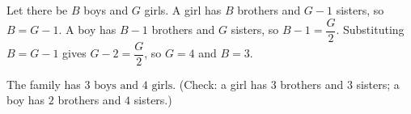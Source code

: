 Let there be $B$ boys and $G$ girls. A girl has $B$ brothers and $G-1$ sisters, so $B=G-1$. A boy has $B-1$ brothers and $G$ sisters, so $B-1=\dfrac G2$. Substituting $B=G-1$ gives $G-2=\dfrac G2$, so $G=4$ and $B=3$.

The family has $\boxed{3\text{ boys and }4\text{ girls}}$. (Check: a girl has $3$ brothers and $3$ sisters; a boy has $2$ brothers and $4$ sisters.)
